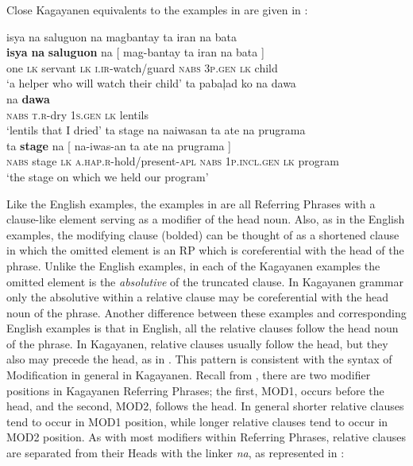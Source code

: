 Close Kagayanen equivalents to the examples in  are given in :

\ea
\label{bkm:Ref116889490}
    \ea
    \label{bkm:Ref116889490a}
    isya  na  saluguon  na  magbantay  ta  iran  na  bata \\\smallskip
\gll \textbf{isya}  \textbf{na}  \textbf{saluguon}  na [ mag-bantay  ta  iran  na  bata ] \\
    one  \textsc{lk}  servant  \textsc{lk}  {} \textsc{i.ir}-watch/guard  \textsc{nabs}  3\textsc{p.gen}  \textsc{lk}  child {} \\
    \glt ‘a helper who will watch their child’
    \ex
    \label{bkm:Ref116889490b}
    ta  pabaļad  ko  na  dawa \\\smallskip
\gll [ ta  pa-baļad  ko ] na \textbf{dawa} \\
    {} \textsc{nabs}  \textsc{t.r}-dry  1\textsc{s.gen}  {} \textsc{lk}  lentils \\
    \glt ‘lentils that I dried’
    \ex
    \label{bkm:Ref116889490bc}
    ta  stage  na  naiwasan  ta  ate  na  prugrama \\\smallskip
\gll ta  \textbf{stage}  na [ na-iwas-an  ta  ate  na  prugrama ] \\
    \textsc{nabs}  stage  \textsc{lk} {} \textsc{a.hap.r}-hold/present-\textsc{apl}  \textsc{nabs}  1\textsc{p.incl.gen}  \textsc{lk}  program {} \\
    \glt ‘the stage on which we held our program’
    \z
\z


Like the English examples, the examples in  are all Referring Phrases with a clause-like element serving as a modifier of the head noun. Also, as in the English examples, the modifying clause (bolded) can be thought of as a shortened clause in which the omitted element is an RP which is coreferential with the head of the phrase. Unlike the English examples, in each of the Kagayanen examples the omitted element is the \textit{absolutive} of the truncated clause. In Kagayanen grammar only the absolutive within a relative clause may be coreferential with the head noun of the phrase. Another difference between these examples and corresponding English examples is that in English, all the relative clauses follow the head noun of the phrase. In Kagayanen, relative clauses usually follow the head, but they also may precede the head, as in . This pattern is consistent with the syntax of Modification in general in Kagayanen. Recall from , there are two modifier positions in Kagayanen Referring Phrases; the first, MOD1, occurs before the head, and the second, MOD2, follows the head. In general shorter relative clauses tend to occur in MOD1 position, while longer relative clauses tend to occur in MOD2 position. As with most modifiers within Referring Phrases, relative clauses are separated from their Heads with the linker \textit{na}, as represented in :

